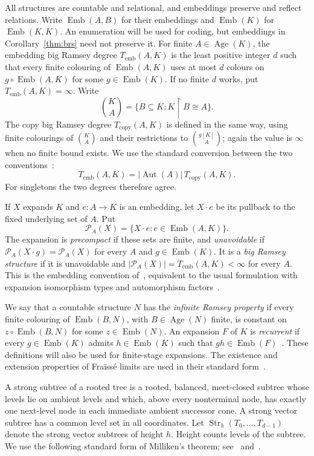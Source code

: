 \documentclass{article}
\numberwithin{equation}{section}
\theoremstyle{definition}
\DeclareMathOperator{\Emb}{Emb}
\DeclareMathOperator{\Age}{Age}
\DeclareMathOperator{\Aut}{Aut}
\DeclareMathOperator{\Str}{Str}
\newcommand{\res}{\mathbin{\upharpoonright}}
\newcommand{\brd}{T_{\mathrm{emb}}}
\newcommand{\crd}{T_{\mathrm{copy}}}
\begin{document}
All structures are countable and relational, and embeddings preserve and
reflect relations. Write $\Emb(A,B)$ for their embeddings and $\Emb(K)$ for
$\Emb(K,K)$. An enumeration will be used for coding, but embeddings in
Corollary~\ref{thm:brs} need not preserve it. For finite $A\in\Age(K)$, the
embedding big Ramsey degree $\brd(A,K)$ is the least positive integer $d$
such that every finite colouring of $\Emb(A,K)$ uses at most $d$ colours on
$g\circ\Emb(A,K)$ for some $g\in\Emb(K)$. If no finite $d$ works, put
$\brd(A,K)=\infty$. Write
\[
 \binom KA=\{B\subseteq K:K\res B\cong A\}.
\]
The copy big Ramsey degree $\crd(A,K)$ is defined in the same way, using
finite colourings of $\binom KA$ and their restrictions to $\binom{g[K]}A$;
again the value is $\infty$ when no finite bound exists. We use the standard
conversion between the two conventions~\cite[Section~2]{HZ}:
\begin{equation}\label{eq:degree-conventions}
\brd(A,K)=|\Aut(A)|\,\crd(A,K).
\end{equation}
For singletons the two degrees therefore agree.

If $X$ expands $K$ and $e:A\to K$ is an embedding, let $X\cdot e$ be its
pullback to the fixed underlying set of $A$. Put
\[
\mathcal P_A(X)=\{X\cdot e:e\in\Emb(A,K)\}.
\]
The expansion is \emph{precompact} if these sets are finite, and
\emph{unavoidable} if $\mathcal P_A(X\cdot g)=\mathcal P_A(X)$ for every
$A$ and $g\in\Emb(K)$. It is a \emph{big Ramsey structure} if it is
unavoidable and $|\mathcal P_A(X)|=\brd(A,K)<\infty$ for every $A$.
This is the embedding convention of~\cite[Definition~3.5]{HZ}, equivalent
to the usual formulation with expansion isomorphism types and automorphism
factors~\cite{ZuckerDynamics}.

We say that a countable structure $N$ has the \emph{infinite Ramsey property}
if every finite colouring of $\Emb(B,N)$, with $B\in\Age(N)$ finite, is
constant on $z\circ\Emb(B,N)$ for some $z\in\Emb(N)$. An expansion $F$ of
$K$ is \emph{recurrent} if every $g\in\Emb(K)$ admits $h\in\Emb(K)$ such
that $gh\in\Emb(F)$~\cite[Definition~3.3(4)]{HZ}. These definitions
will also be used for finite-stage expansions. The existence and extension
properties of Fra\"iss\'e limits are used in their standard form~\cite{Fraisse}.

A strong subtree of a rooted tree is a rooted, balanced, meet-closed subtree
whose levels lie on ambient levels and which, above every nonterminal node,
has exactly one next-level node in each immediate ambient successor cone.
A strong vector subtree has a common level set in all coordinates. Let
$\Str_h(T_0,\ldots,T_{d-1})$ denote the strong vector subtrees of height $h$.
Height counts levels of the subtree. We use the following standard form of
Milliken's theorem; see~\cite{Milliken} and~\cite[Theorem~2.2]{InfiniteLanguages}.
\end{document}
